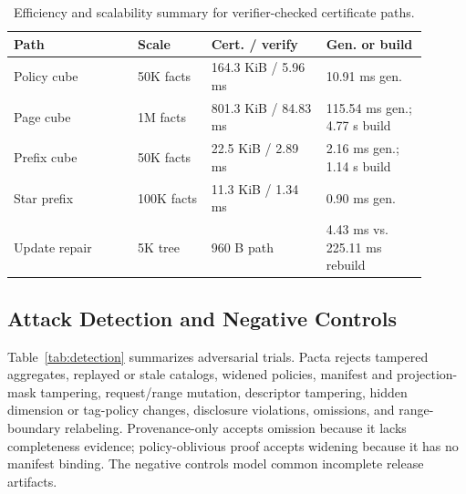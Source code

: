 \documentclass[conference]{IEEEtran}
\newcommand{\sys}{Pacta\xspace}
\begin{document}
\begin{table}[t]
\centering
\caption{Efficiency and scalability summary for verifier-checked certificate paths.}
\label{tab:scale}
\scriptsize
{\setlength{\tabcolsep}{2pt}
\begin{tabular}{@{}p{0.27\linewidth}p{0.16\linewidth}p{0.25\linewidth}p{0.22\linewidth}@{}}
\toprule
Path & Scale & Cert. / verify & Gen. or build \\
\midrule
Policy cube & 50K facts & 164.3 KiB / 5.96 ms & 10.91 ms gen. \\
Page cube & 1M facts & 801.3 KiB / 84.83 ms & 115.54 ms gen.; 4.77 s build \\
Prefix cube & 50K facts & 22.5 KiB / 2.89 ms & 2.16 ms gen.; 1.14 s build \\
Star prefix & 100K facts & 11.3 KiB / 1.34 ms & 0.90 ms gen. \\
Update repair & 5K tree & 960 B path & 4.43 ms vs. 225.11 ms rebuild \\
\bottomrule
\end{tabular}
}
\end{table}

\subsection{Attack Detection and Negative Controls}
Table~\ref{tab:detection} summarizes adversarial trials. \sys rejects tampered aggregates, replayed or stale catalogs, widened policies, manifest and projection-mask tampering, request/range mutation, descriptor tampering, hidden dimension or tag-policy changes, disclosure violations, omissions, and range-boundary relabeling. Provenance-only accepts omission because it lacks completeness evidence; policy-oblivious proof accepts widening because it has no manifest binding. The negative controls model common incomplete release artifacts.
\end{document}
